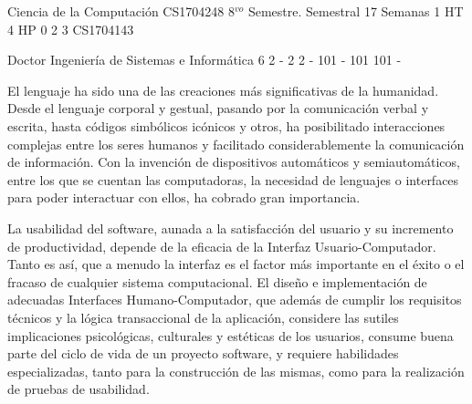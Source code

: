 \documentclass[a4paper,8pt]{article}
\begin{document}
\setNombreProfesor{}
\setGradoProfesorAbreviado{}
\sylabusHeader

\academicaTable
{Ciencia de la Computación} %
{CS1704248} %
{8$^{vo}$ Semestre.} %
{Semestral} %
{17 Semanas} %
{1 HT} %
{4 HP} %
{0} %
{}  %
{2} %
{3} %
{CS1704143} %

\administrativaTable
{Doctor} %
{Ingeniería de Sistemas e Informática} %
{6} %
{2} %
{-} %
{2} %
{2} %
{-} %
{101} %
{-} %
{101} %
{101} %
{-} %


\begin{fundamentacion}
El lenguaje ha sido una de las creaciones más significativas de la humanidad. Desde el lenguaje corporal y gestual, 
pasando por la comunicación verbal y escrita, hasta códigos simbólicos icónicos y otros, ha posibilitado interacciones complejas 
entre los seres humanos y facilitado considerablemente la comunicación de información. 
Con la invención de dispositivos automáticos y semiautomáticos, entre los que se cuentan las computadoras, 
la necesidad de lenguajes o interfaces para poder interactuar con ellos, ha cobrado gran importancia. 

La usabilidad del software, aunada a la satisfacción del usuario y su incremento de productividad, depende de la eficacia de la Interfaz Usuario-Computador.
Tanto es así, que a menudo la interfaz es el factor más importante en el éxito o el fracaso de cualquier sistema computacional. 
El diseño e implementación de adecuadas Interfaces Humano-Computador, que además de cumplir los requisitos técnicos y la 
lógica transaccional de la aplicación, considere las sutiles implicaciones psicológicas, culturales y estéticas de los usuarios, 
consume buena parte del ciclo de vida de un proyecto software, y requiere habilidades especializadas, 
tanto para la construcción de las mismas, como para la realización de pruebas de usabilidad.

\end{fundamentacion}
\end{document}
